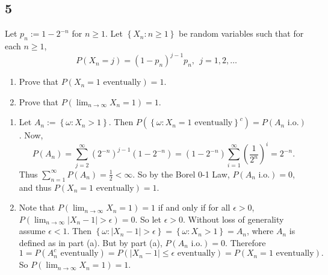 \documentclass[12pt]{article}
\begin{document}
\subsection*{5}
\begin{tcolorbox}
Let $p_{n} := 1 - 2^{-n}$ for $n \geq 1$. Let $\left\{ X_{n} : n\geq 1 \right\}$ be random variables such that for each $n \geq 1$,
\[ P(X_{n} = j) = (1 - p_{n})^{j-1}p_{n}, \ \ j = 1, 2, \hdots \]
\begin{enumerate}[label=(\alph*)]
\item Prove that $P(X_{n} = 1 \text{ eventually}) = 1$.
\item Prove that $P(\lim_{n\rightarrow\infty} X_{n} = 1) = 1$.
\end{enumerate}
\end{tcolorbox}
\begin{enumerate}[label=(\alph*)]
\item Let $A_{n} := \left\{ \omega : X_{n} > 1 \right\}$. Then 
$P\left( \left\{ \omega : X_{n} = 1 \text{ eventually}\right\}^{c} \right) = P\left( A_{n} \text{ i.o.} \right)$. Now,
\[ P(A_{n}) = \sum_{j=2}^{\infty}(2^{-n})^{j-1}(1-2^{-n}) = (1-2^{-n})\sum_{i=1}^{\infty}\left( \frac{1}{2^{n}} \right)^{i} = 2^{-n}. \]
Thus $\sum_{n=1}^{\infty}P(A_{n}) = \frac{1}{2} < \infty$. So by the Borel 0-1 Law, $P(A_{n}\text{ i.o.}) = 0$, and thus $P(X_{n} = 1 \text{ eventually}) = 1$.

\item Note that $P(\lim_{n\rightarrow\infty} X_{n} = 1) = 1$ if and only if for all $\epsilon > 0$, $P(\lim_{n\rightarrow\infty}|X_{n} - 1| > \epsilon) =
0$. So let $\epsilon > 0$. Without loss of generality assume $\epsilon < 1$. Then $\left\{ \omega : |X_{n} - 1| > \epsilon \right\} = \left\{ \omega : 
X_{n} > 1\right\} = A_{n}$, where $A_{n}$ is defined as in part (a). But by part (a), $P(A_{n} \text{ i.o.}) = 0$. Therefore 
\[1 =  P(A_{n}^{c}\text{ eventually}) = P(|X_{n} - 1 | \leq \epsilon \text{ eventually}) = P(X_{n} = 1 \text{ eventually}). \]
So $P(\lim_{n\rightarrow\infty}X_{n} = 1) = 1$.
\end{enumerate}
\end{document}
